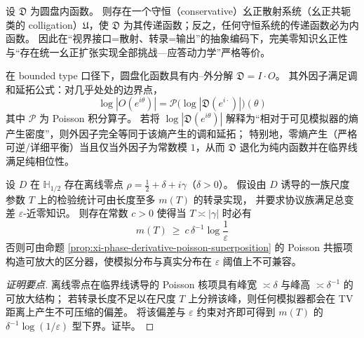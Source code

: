 \begin{theorem}\label{thm:xi-inner-iff-conservative-colligation}
设 \(\mathfrak{D}\) 为圆盘内函数。
则存在一个守恒（conservative）幺正散射系统（幺正共轭类的 colligation）\(\mathfrak{U}\)，使 \(\mathfrak{D}\) 为其传递函数；反之，任何守恒系统的传递函数必为内函数。
因此在“视界接口=散射、转录=输出”的抽象编码下，完美零知识幺正性与“存在统一幺正扩张实现全部挑战—应答动力学”严格等价。
\end{theorem}

\begin{proposition}\label{prop:xi-entropy-production-equals-outer-factor}
在 bounded type 口径下，圆盘化函数具有内–外分解 \(\mathfrak{D}=I\cdot O\)。
其外因子满足调和延拓公式：对几乎处处的边界点，
\[
\boxed{\;
\log|O(e^{i\theta})|
=\mathcal{P}\!\bigl(\log|\mathfrak{D}(e^{i\cdot})|\bigr)(\theta)\;}
\]
其中 \(\mathcal{P}\) 为 Poisson 积分算子。
若将 \(\log|\mathfrak{D}(e^{i\theta})|\) 解释为“相对于可见模拟器的熵产生密度”，则外因子完全等同于该熵产生的调和延拓；
特别地，零熵产生（严格可逆/详细平衡）当且仅当外因子为常数模 \(1\)，从而 \(\mathfrak{D}\) 退化为纯内函数并在临界线满足纯相位性。
\end{proposition}

\begin{proposition}\label{prop:xi-offcritical-zero-forces-transcript-length}
设 \(D\) 在 \(\mathbb{H}_{1/2}\) 存在离线零点 \(\rho=\tfrac12+\delta+i\gamma\)（\(\delta>0\)）。
假设由 \(D\) 诱导的一族尺度参数 \(T\) 上的检验统计可由长度至多 \(m(T)\) 的转录实现，
并要求协议族满足总变差 \(\varepsilon\)-近零知识。
则存在常数 \(c>0\) 使得当 \(T\asymp|\gamma|\) 时必有
\[
\boxed{\;
m(T)\ \ge\ c\,\delta^{-1}\log\!\frac{1}{\varepsilon}\;}
\]
否则可由命题 \ref{prop:xi-phase-derivative-poisson-superposition} 的 Poisson 共振项构造可放大的区分器，使模拟分布与真实分布在 \(\varepsilon\) 阈值上不可兼容。
\end{proposition}
\begin{proof}[证明要点]
离线零点在临界线诱导的 Poisson 核项具有峰宽 \(\asymp\delta\) 与峰高 \(\asymp\delta^{-1}\) 的可放大结构；
若转录长度不足以在尺度 \(T\) 上分辨该峰，则任何模拟器都会在 TV 距离上产生不可压缩的偏差。
将该偏差与 \(\varepsilon\) 约束对齐即可得到 \(m(T)\) 的 \(\delta^{-1}\log(1/\varepsilon)\) 型下界。证毕。
\end{proof}

